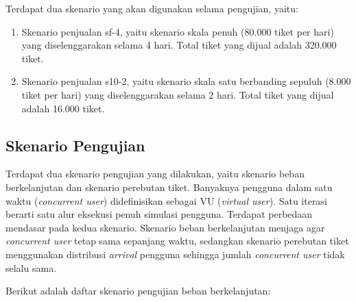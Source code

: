 Terdapat dua skenario yang akan digunakan selama pengujian, yaitu:

\begin{enumerate}
    \item Skenario penjualan sf-4, yaitu skenario skala penuh (80.000 tiket per hari) yang diselenggarakan selama 4 hari. Total tiket yang dijual adalah 320.000 tiket.
    \item Skenario penjualan s10-2, yaitu skenario skala satu berbanding sepuluh (8.000 tiket per hari) yang diselenggarakan selama 2 hari. Total tiket yang dijual adalah 16.000 tiket.
\end{enumerate}

\subsection{Skenario Pengujian}

Terdapat dua skenario pengujian yang dilakukan, yaitu skenario beban berkelanjutan dan skenario perebutan tiket. Banyaknya pengguna dalam satu waktu (\textit{concurrent user}) didefinisikan sebagai VU (\textit{virtual user}). Satu iterasi berarti satu alur eksekusi penuh simulasi pengguna. Terdapat perbedaan mendasar pada kedua skenario. Skenario beban berkelanjutan menjaga agar \textit{concurrent user} tetap sama sepanjang waktu, sedangkan skenario perebutan tiket menggunakan distribusi \textit{arrival} pengguna sehingga jumlah \textit{concurrent user} tidak selalu sama.

Berikut adalah daftar skenario pengujian beban berkelanjutan:

